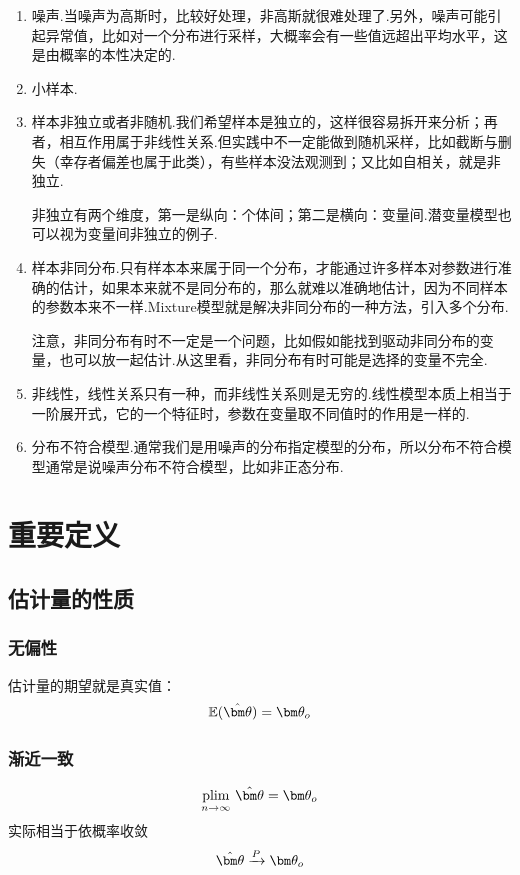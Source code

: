 \begin{enumerate}
\item 噪声.当噪声为高斯时，比较好处理，非高斯就很难处理了.另外，噪声可能引起异常值，比如对一个分布进行采样，大概率会有一些值远超出平均水平，这是由概率的本性决定的.
\item 小样本.
\item 样本非独立或者非随机.我们希望样本是独立的，这样很容易拆开来分析；再者，相互作用属于非线性关系.但实践中不一定能做到随机采样，比如截断与删失（幸存者偏差也属于此类），有些样本没法观测到；又比如自相关，就是非独立.

非独立有两个维度，第一是纵向：个体间；第二是横向：变量间.潜变量模型也可以视为变量间非独立的例子.
\item 样本非同分布.只有样本本来属于同一个分布，才能通过许多样本对参数进行准确的估计，如果本来就不是同分布的，那么就难以准确地估计，因为不同样本的参数本来不一样.Mixture模型就是解决非同分布的一种方法，引入多个分布.

注意，非同分布有时不一定是一个问题，比如假如能找到驱动非同分布的变量，也可以放一起估计.从这里看，非同分布有时可能是选择的变量不完全.
\item 非线性，线性关系只有一种，而非线性关系则是无穷的.线性模型本质上相当于一阶展开式，它的一个特征时，参数在变量取不同值时的作用是一样的.
\item 分布不符合模型.通常我们是用噪声的分布指定模型的分布，所以分布不符合模型通常是说噪声分布不符合模型，比如非正态分布.
\end{enumerate}

\section{重要定义}
\subsection{估计量的性质}
\subsubsection{无偏性}
估计量的期望就是真实值：
$$\E(\hat{\btheta})=\btheta_o$$

\subsubsection{渐近一致}
$$\plim{n\rightarrow \infty} \hat{\btheta}=\btheta_o$$
实际相当于依概率收敛
\begin{equation}
\hat{\btheta}\xrightarrow{P}\btheta_o
\end{equation}

